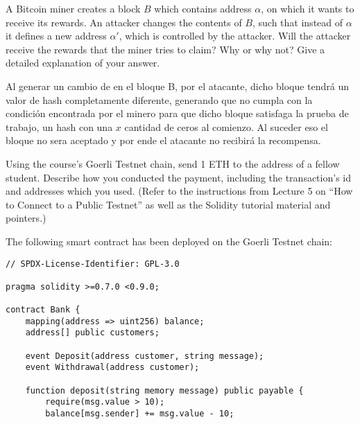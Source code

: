 \documentclass[12pt,addpoints,answers]{exam}
\begin{document}
\begin{questions}
\newpage

\question[10] A Bitcoin miner creates a block $B$ which contains address $\alpha$, on which it wants to receive its rewards. An attacker changes the contents of $B$, such that instead of $\alpha$ it defines a new address $\alpha'$, which is controlled by the attacker. Will the attacker receive the rewards that the miner tries to claim? Why or why not? Give a detailed explanation of your answer.

\begin{solution} %
Al generar un cambio de en el bloque B, por el atacante, dicho bloque tendrá un valor
de hash completamente diferente, generando que no cumpla con la condición encontrada por
el minero para que dicho bloque satisfaga la prueba de trabajo, un hash con una $x$
cantidad de ceros al comienzo.
Al suceder eso el bloque no sera aceptado y por ende el atacante no recibirá la recompensa.
\end{solution}

\newpage

\question[10] Using the course’s Goerli  Testnet chain, send 1 ETH to the address of a fellow student. Describe how you conducted the payment, including the transaction’s id and addresses which you used. (Refer to the instructions from Lecture 5 on ``How to Connect to a Public Testnet'' as well as the Solidity tutorial material and pointers.)



\newpage

\question The following smart contract has been deployed on the Goerli Testnet chain:

{\footnotesize

\begin{verbatim}
// SPDX-License-Identifier: GPL-3.0

pragma solidity >=0.7.0 <0.9.0;

contract Bank {
    mapping(address => uint256) balance;
    address[] public customers;

    event Deposit(address customer, string message);
    event Withdrawal(address customer);

    function deposit(string memory message) public payable {
        require(msg.value > 10);
        balance[msg.sender] += msg.value - 10;


\end{verbatim}}
\end{questions}
\end{document}
